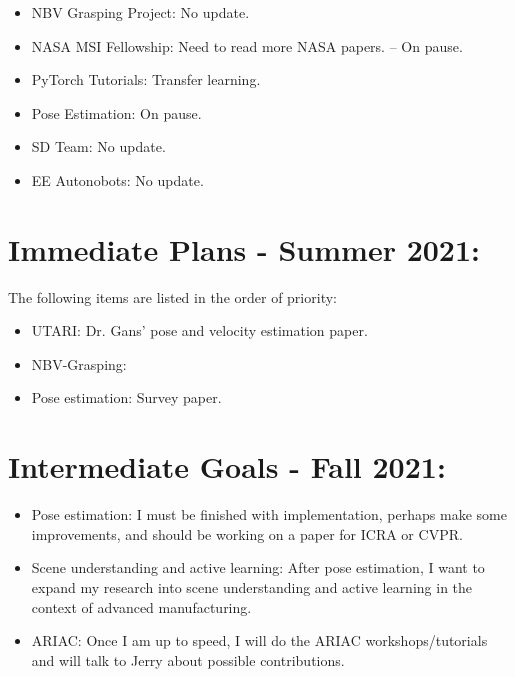 \documentclass[11pt]{article}
\begin{document}
\begin{itemize}
      \item NBV Grasping Project: No update.
      \item NASA MSI Fellowship: Need to read more NASA papers. -- On pause.
      \item PyTorch Tutorials: Transfer learning.
      \item Pose Estimation: On pause.
      \item SD Team: No update.
      \item EE Autonobots: No update.
\end{itemize}


\section{Immediate Plans - Summer 2021:}
The following items are listed in the order of priority:

\begin{itemize}
      \item UTARI: Dr. Gans' pose and velocity estimation paper.
      \item NBV-Grasping:
      \item Pose estimation: Survey paper.
\end{itemize}

\section{Intermediate Goals - Fall 2021:}
\begin{itemize}
      \item Pose estimation: I must be finished with implementation, perhaps make some improvements, and should be working on a paper for ICRA or CVPR.
      \item Scene understanding and active learning: After pose estimation, I want to expand my research into scene understanding and active learning in the context of advanced manufacturing.
      \item ARIAC: Once I am up to speed, I will do the ARIAC workshops/tutorials and will talk to Jerry about possible contributions.
\end{itemize}


\newpage


\end{document}
